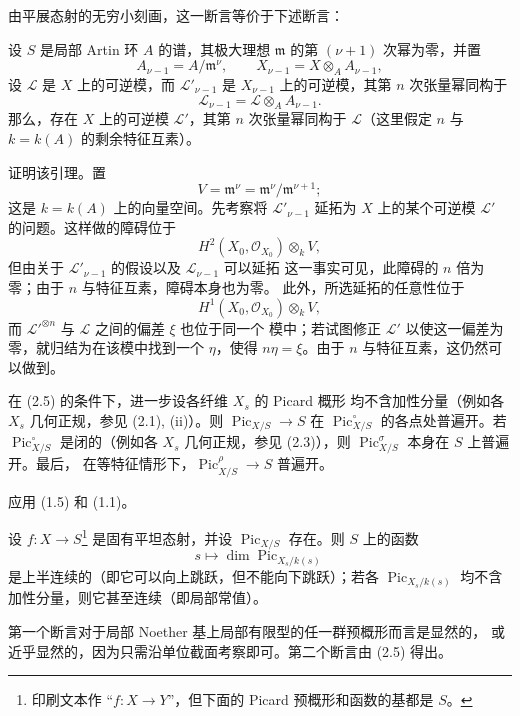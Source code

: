 由平展态射的无穷小刻画，这一断言等价于下述断言：

 设 $S$ 是局部 Artin 环 $A$ 的谱，其极大理想
$\mathfrak m$ 的第 $(\nu+1)$ 次幂为零，并置
\[
A_{\nu-1}=A/\mathfrak m^\nu,
\qquad X_{\nu-1}=X\otimes_A A_{\nu-1},
\]
设 $\mathcal L$ 是 $X$ 上的可逆模，而 $\mathcal L'_{\nu-1}$ 是
$X_{\nu-1}$ 上的可逆模，其第 $n$ 次张量幂同构于
\[
\mathcal L_{\nu-1}=\mathcal L\otimes_A A_{\nu-1}.
\]
那么，存在 $X$ 上的可逆模 $\mathcal L'$，其第 $n$ 次张量幂同构于
$\mathcal L$（这里假定 $n$ 与 $k=k(A)$ 的剩余特征互素）。

证明该引理。置
\[
V=\mathfrak m^\nu=\mathfrak m^\nu/\mathfrak m^{\nu+1} ;
\]
这是 $k=k(A)$ 上的向量空间。先考察将 $\mathcal L'_{\nu-1}$ 延拓为 $X$
上的某个可逆模 $\mathcal L'$ 的问题。这样做的障碍位于
\[
H^2(X_0,\mathcal O_{X_0})\otimes_k V,
\]
但由关于 $\mathcal L'_{\nu-1}$ 的假设以及 $\mathcal L_{\nu-1}$ 可以延拓
这一事实可见，此障碍的 $n$ 倍为零；由于 $n$ 与特征互素，障碍本身也为零。
此外，所选延拓的任意性位于
\[
H^1(X_0,\mathcal O_{X_0})\otimes_k V,
\]
而 $\mathcal L'^{\otimes n}$ 与 $\mathcal L$ 之间的偏差 $\xi$ 也位于同一个
模中；若试图修正 $\mathcal L'$ 以使这一偏差为零，就归结为在该模中找到一个
$\eta$，使得 $n\eta=\xi$。由于 $n$ 与特征互素，这仍然可以做到。

 在 (2.5) 的条件下，进一步设各纤维 $X_s$ 的 Picard 概形
均不含加性分量（例如各 $X_s$ 几何正规，参见 (2.1), (ii)）。则
$\operatorname{Pic}_{X/S}\longrightarrow S$ 在
$\operatorname{Pic}_{X/S}^\circ$ 的各点处普遍开。若
$\operatorname{Pic}_{X/S}^\circ$ 是闭的（例如各 $X_s$ 几何正规，参见
(2.3)），则 $\operatorname{Pic}_{X/S}^\sigma$ 本身在 $S$ 上普遍开。最后，
在等特征情形下，$\operatorname{Pic}_{X/S}^\rho\longrightarrow S$ 普遍开。

应用 (1.5) 和 (1.1)。

 设 $f:X\longrightarrow S$\footnote{印刷文本作
“$f:X\longrightarrow Y$”，但下面的 Picard 预概形和函数的基都是 $S$。}
是固有平坦态射，并设 $\operatorname{Pic}_{X/S}$ 存在。则 $S$ 上的函数
\[
s\longmapsto\dim\operatorname{Pic}_{X_s/k(s)}
\]
是上半连续的（即它可以向上跳跃，但不能向下跳跃）；若各
$\operatorname{Pic}_{X_s/k(s)}$ 均不含加性分量，则它甚至连续（即局部常值）。

第一个断言对于局部 Noether 基上局部有限型的任一群预概形而言是显然的，
或近乎显然的，因为只需沿单位截面考察即可。第二个断言由 (2.5) 得出。

